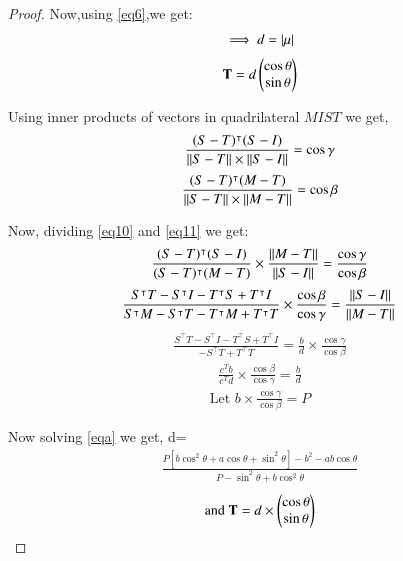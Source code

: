 \documentclass[journal,12pt,twocolumn]{IEEEtran}
\begin{document}
\begin{enumerate}
\begin{proof}
Now,using  \eqref{eq6},we get:
\begin{align}
\implies d=\vert\mu\vert
\end{align}
\begin{align}
\mathbf{T}=d \begin{pmatrix}\cos \theta\\\sin \theta \end{pmatrix} \label{eq9}
\end{align}
\item Using inner products of vectors in quadrilateral $MIST$ we get,
\begin{align}
\frac{(S-T)^\intercal(S-I)}{\Vert S-T\rVert\times\Vert S-I\rVert}=\cos\gamma \label{eq10}
\end{align}
\begin{align}
\frac{(S-T)^\intercal(M-T)}{\Vert S-T\rVert\times\Vert M-T\rVert}=\cos \beta \label{eq11}
\end{align}
\item Now, dividing \eqref{eq10} and \eqref{eq11} we get:
\begin{align}
\frac{(S-T)^\intercal(S-I)}{(S-T)^\intercal(M-T)} \times \frac{\Vert M-T\rVert}{\Vert S-I\rVert}=\frac{\cos \gamma}{\cos \beta} 
\end{align}
\begin{align}
\frac{S^\intercal T-S^\intercal I-T^\intercal S+T^\intercal I}{S^\intercal M-S^\intercal T-T^\intercal M+T^\intercal T} \times\frac{\cos \beta}{\cos \gamma}= \frac{\Vert S-I\rVert}{\Vert M-T\rVert}
\end{align}
\begin{align}
\frac{S^\intercal T-S^\intercal I-T^\intercal S+T^\intercal I}{-S^\intercal T+T^\intercal T} = \frac{b}{d}\times \frac{\cos \gamma}{\cos \beta} \label{eqa}
\end{align}
\begin{align}
\frac{c^Tb}{c^T d} \times \frac{\cos \beta}{\cos \gamma} =\frac{b}{d}
\end{align}
\begin{align}
\text{Let } b\times \frac{\cos \gamma}{\cos\beta} = P
\end{align}
\item Now solving \eqref{eqa} we get, d=
\begin{multline}
\frac{P[b\cos^2\theta+a\cos\theta+\sin^2\theta]-b^2-ab\cos\theta} {P-\sin^2\theta +b\cos^2 \theta}  \label{eqb} 
\end{multline}
\begin{align}
\text{and  }\mathbf{T}=d \times{\ensuremath{\begin{pmatrix}\cos \theta\\ \sin \theta\end{pmatrix}}}
\end{align}
\end{proof}

\end{enumerate}
\end{document}
